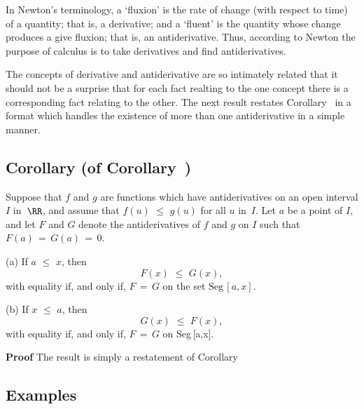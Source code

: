 \noindent In Newton's terminology, a `fluxion' is the rate of change (with respect to time) of a quantity; that is, a derivative;
    and a `fluent' is the quantity whose change produces a give fluxion; that is, an antiderivative.
    Thus, according to Newton the purpose of calculus is to take derivatives and find antiderivatives.



\VV

       The concepts of derivative and antiderivative are so intimately related that it should not be a surprise that for each fact realting to the one concept there is a corresponding fact relating to the other.
    The next result restates Corollary~ in a format which handles the existence of more than one antiderivative in a simple manner.

\V

             \subsection{\small{\bf Corollary (of Corollary~)}}
            \label{CorE45.75}

\V

        Suppose that $f$ and $g$ are functions which have antiderivatives on an open interval $I$ in~${\RR}$,
    and assume that $f(u)\,\,{\leq}\,\,g(u)$ for all $u$ in~$I$. Let $a$ be a point of $I$,
    and let $F$ and $G$ denote the antiderivatives of $f$ and $g$ on $I$ such that $F(a) \,=\, G(a) \,=\, 0$.


\V

      (a) If $a\,\,{\leq}\,\,x$, then      
        \begin{displaymath}
        F(x)\,\,{\leq}\,\,G(x),
        \end{displaymath}
    with equality if, and only if, $F \,=\, G$ on the set $\mbox{Seg}\,[a,x]$.

\V

        (b) If $x\,\,{\leq}\,\,a$, then
        \begin{displaymath}
        G(x)\,\,{\leq}\,\,F(x),
        \end{displaymath}
    with equality if, and only if, $F \,=\, G$ on {\mbox{Seg}\,[a,x]}.

\V

{\bf Proof} The result is simply a restatement of Corollary~ \Q

\VV

             \subsection{\small{\bf Examples}}
            \label{ExampE45.75A}

